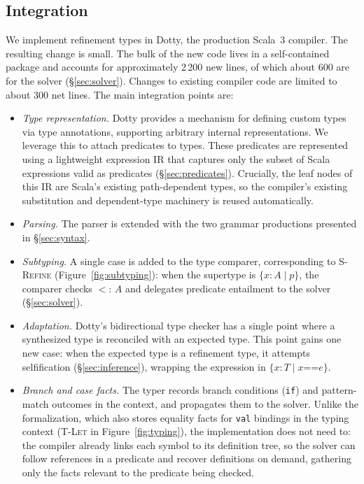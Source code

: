 \documentclass[acmsmall]{acmart}
\begin{document}
\subsection{Integration}\label{sec:integration}

We implement refinement types in Dotty, the production Scala~3 compiler. The resulting change is small. The bulk of the new code lives in a self-contained package and accounts for approximately 2\,200 new lines, of which about 600 are for the solver (\S\ref{sec:solver}). Changes to existing compiler code are limited to about 300 net lines. The main integration points are:

\begin{itemize}
  \item \emph{Type representation.} Dotty provides a mechanism for defining custom types via type annotations, supporting arbitrary internal representations. We leverage this to attach predicates to types. These predicates are represented using a lightweight expression IR that captures only the subset of Scala expressions valid as predicates (\S\ref{sec:predicates}). Crucially, the leaf nodes of this IR are Scala's existing path-dependent types, so the compiler's existing substitution and dependent-type machinery is reused automatically.
  \item \emph{Parsing.} The parser is extended with the two grammar productions presented in \S\ref{sec:syntax}.
  \item \emph{Subtyping.} A single case is added to the type comparer, corresponding to \textsc{S-Refine} (Figure~\ref{fig:subtyping}): when the supertype is $\{x : A \mid p\}$, the comparer checks $\mathord{<:}\, A$ and delegates predicate entailment to the solver (\S\ref{sec:solver}).
  \item \emph{Adaptation.} Dotty's bidirectional type checker has a single point where a synthesized type is reconciled with an expected type. This point gains one new case: when the expected type is a refinement type, it attempts selfification (\S\ref{sec:inference}), wrapping the expression in $\{x : T \mid x \mathbin{\texttt{==}} e\}$.
  \item \emph{Branch and case facts.} The typer records branch conditions (\lstinline!if!) and pattern-match outcomes in the context, and propagates them to the solver. Unlike the formalization, which also stores equality facts for \lstinline!val! bindings in the typing context (\textsc{T-Let} in Figure~\ref{fig:typing}), the implementation does not need to: the compiler already links each symbol to its definition tree, so the solver can follow references in a predicate and recover definitions on demand, gathering only the facts relevant to the predicate being checked.

\end{itemize}
\end{document}
